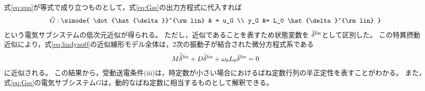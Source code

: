 \documentclass[tombow,dvipdfmx]{corona-a5-1.1}
\begin{document}
式\ref{eq:spa}が等式で成り立つものとして，式\ref{eq:Gss}の出力方程式に代入すれば
\begin{align}\label{eq:Gsssp}
\hat{G}: \simode{
\dot{\hat{\delta}}^{\rm lin} & = u_G \\
y_G &= L_0 \hat{\delta}^{\rm lin}
}
\end{align}
という電気サブシステムの低次元近似が得られる。
ただし，近似であることを表すため状態変数を
$\hat{\delta}^{\rm lin}$として区別した。
この特異摂動近似により，式\ref{eq:lindynu0}の近似線形モデル全体は，2次の振動子が結合された微分方程式系である
\begin{align}\label{eq:spamodel}
M \ddot{\hat{\delta}}^{\rm lin}
+ D \dot{\hat{\delta}}^{\rm lin}
+\omega_0 L_0 \hat{\delta}^{\rm lin}=0
\end{align}
に近似される。
この結果から，受動送電条件(iii)は，時定数が小さい場合におけるばね定数行列の半正定性を表すことがわかる。
また，式\ref{eq:Gss}の電気サブシステム$G$は，動的なばね定数に相当するものとして解釈できる。
\end{document}
